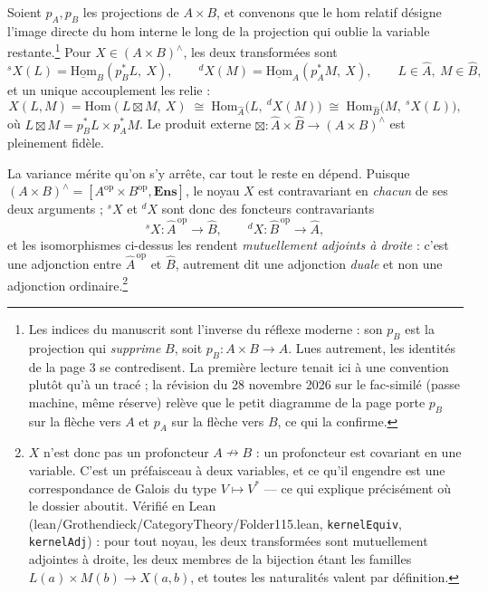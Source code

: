 \documentclass[11pt,a4paper]{article}
\begin{document}
Soient $p_{A}, p_{B}$ les projections de $A \times B$, et convenons que le hom
relatif désigne l'image directe du hom interne le long de la projection qui
oublie la variable restante.\footnote{Les indices du manuscrit sont l'inverse
du réflexe moderne : son $p_{B}$ est la projection qui \emph{supprime} $B$,
soit $p_{B} : A \times B \to A$. Lues autrement, les identités de la page 3
se contredisent. La première lecture tenait ici à une convention plutôt qu'à
un tracé ; la révision du 28 novembre 2026 sur le fac-similé (passe machine,
même réserve) relève que le petit diagramme de la page porte $p_{B}$ sur la
flèche vers $A$ et $p_{A}$ sur la flèche vers $B$, ce qui la confirme.} Pour $X \in (A \times B)^{\wedge}$, les deux
transformées sont
\[
{}^{s}X(L) = \underline{\mathrm{Hom}}_{B}(p_{B}^{*}L,\ X), \qquad
{}^{d}X(M) = \underline{\mathrm{Hom}}_{A}(p_{A}^{*}M,\ X),
\qquad L \in \widehat{A},\ M \in \widehat{B},
\]
et un unique accouplement les relie :
\[
X(L,M) = \mathrm{Hom}(L \boxtimes M,\ X)
\;\cong\; \mathrm{Hom}_{\widehat{A}}\bigl(L,\ {}^{d}X(M)\bigr)
\;\cong\; \mathrm{Hom}_{\widehat{B}}\bigl(M,\ {}^{s}X(L)\bigr),
\]
où $L \boxtimes M = p_{B}^{*}L \times p_{A}^{*}M$.
Le produit externe $\boxtimes : \widehat{A} \times \widehat{B} \to (A \times
B)^{\wedge}$ est pleinement fidèle.

La variance mérite qu'on s'y arrête, car tout le reste en dépend. Puisque
$(A\times B)^{\wedge} = [A^{\mathrm{op}} \times B^{\mathrm{op}},
\mathbf{Ens}]$, le noyau $X$ est contravariant en \emph{chacun} de ses deux
arguments ; ${}^{s}X$ et ${}^{d}X$ sont donc des foncteurs contravariants
\[
{}^{s}X : \widehat{A}^{\,\mathrm{op}} \longrightarrow \widehat{B},
\qquad
{}^{d}X : \widehat{B}^{\,\mathrm{op}} \longrightarrow \widehat{A},
\]
et les isomorphismes ci-dessus les rendent \emph{mutuellement adjoints à
droite} : c'est une adjonction entre $\widehat{A}^{\,\mathrm{op}}$ et
$\widehat{B}$, autrement dit une adjonction \emph{duale} et non une adjonction
ordinaire.\footnote{$X$ n'est donc pas un profoncteur $A \nrightarrow B$ : un
profoncteur est covariant en une variable. C'est un préfaisceau à deux
variables, et ce qu'il engendre est une correspondance de Galois du type
$V \mapsto V^{*}$ — ce qui explique précisément où le dossier aboutit.
Vérifié en Lean (lean/Grothendieck/CategoryTheory/Folder115.lean, \texttt{kernelEquiv},
\texttt{kernelAdj}) : pour tout noyau, les deux transformées sont
mutuellement adjointes à droite, les deux membres de la bijection étant les
familles $L(a) \times M(b) \to X(a, b)$, et toutes les naturalités valent par
définition.}
\end{document}
